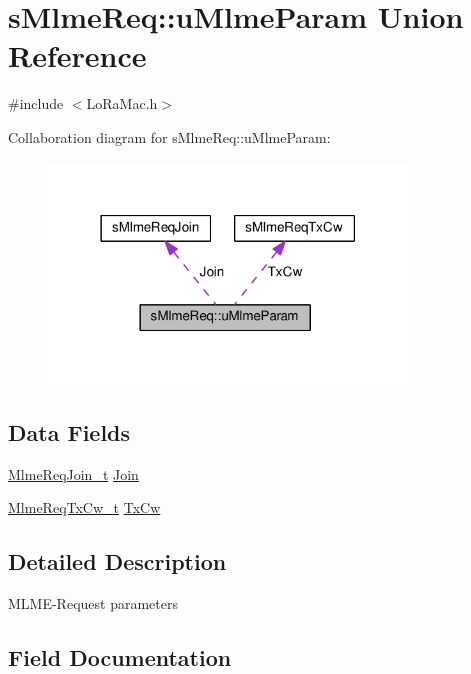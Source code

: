 \hypertarget{unionsMlmeReq_1_1uMlmeParam}{}\section{s\+Mlme\+Req\+:\+:u\+Mlme\+Param Union Reference}
\label{unionsMlmeReq_1_1uMlmeParam}


{\ttfamily \#include $<$Lo\+Ra\+Mac.\+h$>$}



Collaboration diagram for s\+Mlme\+Req\+:\+:u\+Mlme\+Param\+:
\nopagebreak
\begin{figure}[H]
\begin{center}
\leavevmode
\includegraphics[width=270pt]{unionsMlmeReq_1_1uMlmeParam__coll__graph}
\end{center}
\end{figure}
\subsection*{Data Fields}
\begin{DoxyCompactItemize}
\item 
\hyperlink{group__LORAMAC_gab12f7f7d9bdfb8067d56f7c9f1297d95}{Mlme\+Req\+Join\+\_\+t} \hyperlink{unionsMlmeReq_1_1uMlmeParam_a8065a3a3d703e59ee8ee10ed48bcb726}{Join}
\item 
\hyperlink{group__LORAMAC_gab71a9931686ff623fa01ceecc61f1986}{Mlme\+Req\+Tx\+Cw\+\_\+t} \hyperlink{unionsMlmeReq_1_1uMlmeParam_a574dc0aa0d991726f55da055105c5dcf}{Tx\+Cw}
\end{DoxyCompactItemize}


\subsection{Detailed Description}
M\+L\+M\+E-\/\+Request parameters 

\subsection{Field Documentation}
\mbox{\label{unionsMlmeReq_1_1uMlmeParam_a8065a3a3d703e59ee8ee10ed48bcb726}} 
